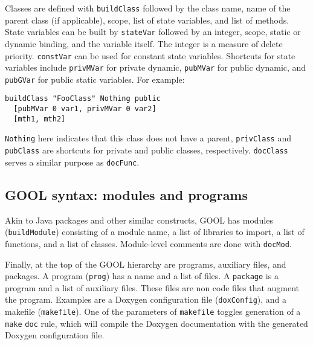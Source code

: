 \documentclass[sigplan,review,anonymous,prologue,dvipsnames]{acmart}
\newcommand{\Cplusplus}{C\texttt{++}}
\begin{document}
Classes are defined with \verb|buildClass| followed by the class name, name of
the parent class (if applicable), scope, list of state variables, and list of
methods. State variables can be built by \verb|stateVar| followed by an
integer, scope, static or dynamic binding, and the variable itself. The integer
is a measure of delete priority. \verb|constVar| can be used for constant state
variables. Shortcuts for state variables include \verb|privMVar| for private
dynamic, \verb|pubMVar| for public dynamic, and \verb|pubGVar| for public
static variables. For example:
\begin{lstlisting}
buildClass "FooClass" Nothing public
  [pubMVar 0 var1, privMVar 0 var2]
  [mth1, mth2]
\end{lstlisting}
\verb|Nothing| here indicates that this class does not have a parent,
\verb|privClass| and \verb|pubClass| are shortcuts for private and public
classes, respectively. \verb|docClass| serves a similar purpose as \verb|docFunc|.

\subsection{GOOL syntax: modules and programs}

Akin to Java packages and other similar constructs, GOOL has modules
(\verb|buildModule|) consisting of a module name, a list of libraries to import,
a list of functions, and a list of classes. Module-level comments are done
with \verb|docMod|.

\begin{comment}
Passing a module to
\verb|fileDoc| will put the finishing touches on the generated file, such as
imports of standard libraries and preprocessor guards for \Cplusplus header files.
\begin{lstlisting}
fileDoc \$ buildModule "mod1" ["library1"]
  [func1, func2] [class1, class2]
\end{lstlisting}
\end{comment}

Finally, at the top of the GOOL hierarchy are programs, auxiliary files, and
packages. A program (\verb|prog|) has a name and a list of files.  A
\verb|package| is a program and a list of auxiliary files. These files are non
code files that augment the program. Examples are a Doxygen configuration file
(\verb|doxConfig|), and a makefile (\verb|makefile|).  One of the parameters of
\verb|makefile| toggles generation of a \verb|make| \verb|doc| rule, which will
compile the Doxygen documentation with the generated Doxygen configuration
file.
\end{document}
